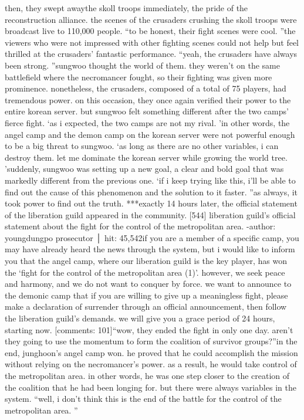  then, they swept awaythe skoll troops immediately, the pride of the reconstruction alliance.
 the scenes of the crusaders crushing the skoll troops were broadcast live to 110,000 people.
“to be honest, their fight scenes were cool.
”the viewers who were not impressed with other fighting scenes could not help but feel thrilled at the crusaders’ fantastic performance.
“yeah, the crusaders have always been strong.
”sungwoo thought the world of them.
 they weren’t on the same battlefield where the necromancer fought, so their fighting was given more prominence.
 nonetheless, the crusaders, composed of a total of 75 players, had tremendous power.
on this occasion, they once again verified their power to the entire korean server.
but sungwoo felt something different after the two camps’ fierce fight.
‘as i expected, the two camps are not my rival.
’in other words, the angel camp and the demon camp on the korean server were not powerful enough to be a big threat to sungwoo.
‘as long as there are no other variables, i can destroy them.
 let me dominate the korean server while growing the world tree.
’suddenly, sungwoo was setting up a new goal, a clear and bold goal that was markedly different from the previous one.
‘if i keep trying like this, i’ll be able to find out the cause of this phenomenon and the solution to it faster.
”as always, it took power to find out the truth.
***exactly 14 hours later, the official statement of the liberation guild appeared in the community.
[544] liberation guild’s official statement about the fight for the control of the metropolitan area.
-author: youngdungpo prosecutor │ hit: 45,542if you are a member of a specific camp, you may have already heard the news through the system, but i would like to inform you that the angel camp, where our liberation guild is the key player, has won the ‘fight for the control of the metropolitan area (1)’.
however, we seek peace and harmony, and we do not want to conquer by force.
we want to announce to the demonic camp that if you are willing to give up a meaningless fight, please make a declaration of surrender through an official announcement, then follow the liberation guild’s demands.
 we will give you a grace period of 24 hours, starting now.
[comments: 101]“wow, they ended the fight in only one day.
 aren’t they going to use the momentum to form the coalition of survivor groups?”in the end, junghoon’s angel camp won.
 he proved that he could accomplish the mission without relying on the necromancer’s power.
 as a result, he would take control of the metropolitan area.
 in other words, he was one step closer to the creation of the coalition that he had been longing for.
but there were always variables in the system.
“well, i don’t think this is the end of the battle for the control of the metropolitan area.
”

